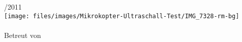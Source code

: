 \begin{titlepage}
	\centering
	\vspace*{3ex}
	\huge \resizebox{5cm}{0.8cm}{\textbf{\textsf{\TITEL}}} \\
	\vspace{1cm}
	\LARGE\textsc{\SUBJECT}\\
	\vspace{1cm}
	\normalsize
	\CREATEDYEAR/2011 \\
	\vspace{0.7cm}
	\texttt{[image: files/images/Mikrokopter-Ultraschall-Test/IMG\_7328-rm-bg]} \\
	\vspace{1cm}
	\AUTHOR \\
	\vspace{0.1cm}
	Betreut von \Betreuer
\end{titlepage}
